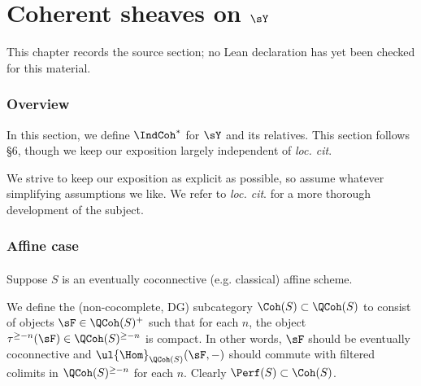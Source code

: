 \chapter{Coherent sheaves on $\sY$}
\label{tates-thesis-de-rham-setting-chapter-04}

\begin{remark}
\label{tates-thesis-de-rham-setting-chapter-04-source}
This chapter records the source section; no Lean declaration has yet been checked for this material.
\notready
\end{remark}

\label{s:indcoh}

\subsection{Overview}

In this section, we define $\IndCoh^*$ for $\sY$ and its relatives.
This section follows \cite{methods} \S 6, though we keep our exposition largely
independent of \emph{loc. cit}.

We strive to keep our exposition as explicit as possible, so assume
whatever simplifying assumptions we like. We refer to \emph{loc. cit}. for
a more thorough development of the subject.

\subsection{Affine case}

\subsubsection{}

Suppose $S$ is an eventually coconnective (e.g. classical) affine scheme.

We define the (non-cocomplete, DG) subcategory $\Coh(S) \subset \QCoh(S)$
to consist of objects $\sF \in \QCoh(S)^+$ such that for each $n$, the object
$\tau^{\geq -n}(\sF) \in \QCoh(S)^{\geq -n}$ is compact.
In other words, $\sF$ should be eventually coconnective and
$\ul{\Hom}_{\QCoh(S)}(\sF,-)$ should commute with
filtered colimits in $\QCoh(S)^{\geq -n}$ for each $n$.
Clearly $\Perf(S) \subset \Coh(S)$.


